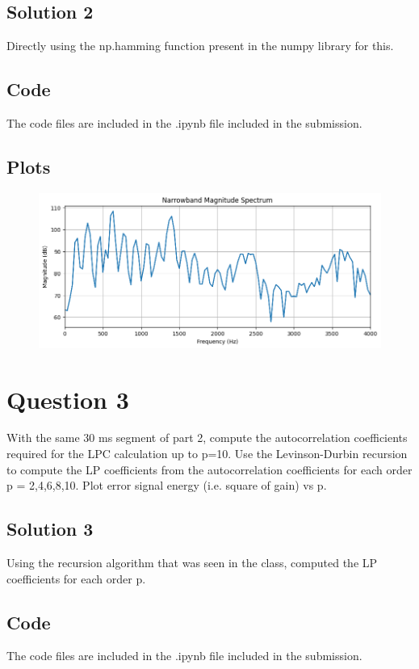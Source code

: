\documentclass{article}
\begin{document}
\subsection{Solution 2}
Directly using the np.hamming function present in the numpy library for this.

\subsection{Code}
The code files are included in the .ipynb file included in the submission.

\subsection{Plots}

\begin{figure}[H]
\begin{center}
\includegraphics[scale = 0.5]{mag.png}
\end{center}
\end{figure}


\section{Question 3}
With the same 30 ms segment of part 2, compute the autocorrelation coefficients required for the LPC calculation up to p=10. Use the Levinson-Durbin recursion to compute the LP coefficients from the autocorrelation coefficients for each order p = 2,4,6,8,10. Plot error signal energy (i.e. square of gain) vs p.

\subsection{Solution 3}
Using the recursion algorithm that was seen in the class, computed the LP coefficients for each order p.

\subsection{Code}
The code files are included in the .ipynb file included in the submission.
\end{document}
